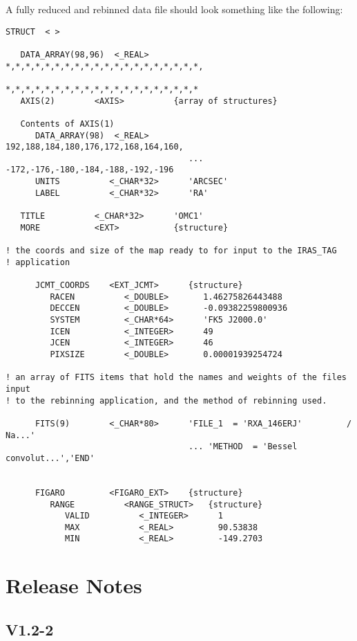 \documentclass[twoside,11pt]{article}
\renewcommand{\_}{\texttt{\symbol{95}}}
\begin{document}
\goodbreak

A fully reduced and rebinned data file should look something like the
following:

\begin{small}
\begin{verbatim}
STRUCT  < >

   DATA_ARRAY(98,96)  <_REAL>     *,*,*,*,*,*,*,*,*,*,*,*,*,*,*,*,*,*,*,*,
                                  *,*,*,*,*,*,*,*,*,*,*,*,*,*,*,*,*,*,*,*
   AXIS(2)        <AXIS>          {array of structures}

   Contents of AXIS(1)
      DATA_ARRAY(98)  <_REAL>        192,188,184,180,176,172,168,164,160,
                                     ... -172,-176,-180,-184,-188,-192,-196
      UNITS          <_CHAR*32>      'ARCSEC'
      LABEL          <_CHAR*32>      'RA'

   TITLE          <_CHAR*32>      'OMC1'
   MORE           <EXT>           {structure}

! the coords and size of the map ready to for input to the IRAS_TAG
! application

      JCMT_COORDS    <EXT_JCMT>      {structure}
         RACEN          <_DOUBLE>       1.46275826443488
         DECCEN         <_DOUBLE>       -0.09382259800936
         SYSTEM         <_CHAR*64>      'FK5 J2000.0'
         ICEN           <_INTEGER>      49
         JCEN           <_INTEGER>      46
         PIXSIZE        <_DOUBLE>       0.00001939254724

! an array of FITS items that hold the names and weights of the files input
! to the rebinning application, and the method of rebinning used.

      FITS(9)        <_CHAR*80>      'FILE_1  = 'RXA_146ERJ'         / Na...'
                                     ... 'METHOD  = 'Bessel convolut...','END'


      FIGARO         <FIGARO_EXT>    {structure}
         RANGE          <RANGE_STRUCT>   {structure}
            VALID          <_INTEGER>      1
            MAX            <_REAL>         90.53838
            MIN            <_REAL>         -149.2703
\end{verbatim}
\end{small}

\section*{Release Notes}

\subsection*{V1.2-2}
\end{document}
